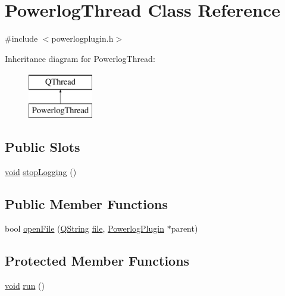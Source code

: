 \hypertarget{class_powerlog_thread}{\section{Powerlog\-Thread Class Reference}
\label{class_powerlog_thread}
}


{\ttfamily \#include $<$powerlogplugin.\-h$>$}

Inheritance diagram for Powerlog\-Thread\-:\begin{figure}[H]
\begin{center}
\leavevmode
\includegraphics[height=2.000000cm]{class_powerlog_thread}
\end{center}
\end{figure}
\subsection*{Public Slots}
\begin{DoxyCompactItemize}
\item 
\hyperlink{group___u_a_v_objects_plugin_ga444cf2ff3f0ecbe028adce838d373f5c}{void} \hyperlink{group___power_log_ga9a391d6c905ecddc9bbc2dd34f055d7c}{stop\-Logging} ()
\end{DoxyCompactItemize}
\subsection*{Public Member Functions}
\begin{DoxyCompactItemize}
\item 
bool \hyperlink{group___power_log_gac2181c168547833f7826354c333cd431}{open\-File} (\hyperlink{group___u_a_v_objects_plugin_gab9d252f49c333c94a72f97ce3105a32d}{Q\-String} \hyperlink{uavobjecttemplate_8m_a97c04efa65bcf0928abf9260bc5cbf46}{file}, \hyperlink{class_powerlog_plugin}{Powerlog\-Plugin} $\ast$parent)
\end{DoxyCompactItemize}
\subsection*{Protected Member Functions}
\begin{DoxyCompactItemize}
\item 
\hyperlink{group___u_a_v_objects_plugin_ga444cf2ff3f0ecbe028adce838d373f5c}{void} \hyperlink{group___power_log_ga8a04077cf7c30019689b894c73cb0020}{run} ()
\end{DoxyCompactItemize}
